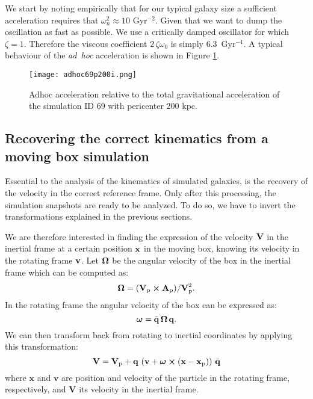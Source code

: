 We start by noting empirically that for our typical galaxy size a sufficient acceleration requires that $\omega_n^2\approx 10$ Gyr$^{-2}$.
Given that we want to dump the oscillation as fast as possible. We use a critically damped oscillator  for which $\zeta = 1$. Therefore the viscous coefficient $2\,\zeta\omega_0$ is simply $6.3$~Gyr$^{-1}$.
A typical behaviour of the \emph{ad~hoc} acceleration is shown in Figure \ref{fig:adhoc}.

\begin{figure}[ht]
\centering
  \texttt{[image: adhoc69p200i.png]}
\caption{Adhoc acceleration relative to the total gravitational acceleration of the simulation ID 69 with pericenter 200 kpc.}
\label{fig:adhoc}
\end{figure}


\subsection{Recovering the correct kinematics from a moving box simulation}
\label{sec:correct_kinematics}
Essential to the analysis of the kinematics of simulated galaxies, is the recovery of the velocity in the correct reference frame.
Only after this processing, the simulation snapshots are ready to be analyzed.
To do so, we have to invert the transformations explained in the previous sections.

We are therefore interested in finding the expression of the velocity $\boldsymbol{\mathbf{V}}$ in the inertial frame at a certain position $\boldsymbol{\mathbf{x}}$ in the moving box, knowing its velocity in the rotating frame $\boldsymbol{\mathbf{v}}$.
Let $\boldsymbol{\mathbf{\Omega}}$ be the angular velocity of the box in the inertial frame which can be computed as:
\begin{equation}
 \boldsymbol{\mathbf{\Omega}} = {(\boldsymbol{\mathbf{V}}_{\mathrm p}\cross\boldsymbol{\mathbf{A}}_{\mathrm p})}/{\boldsymbol{\mathbf{V}}_{\mathrm p}^2}.
\end{equation}
In the rotating frame the angular velocity of the box can be expressed as:
\begin{equation}
\boldsymbol{\mathbf{\omega}} = \bar{\mathbf{q}}\, \boldsymbol{\mathbf{\Omega}}\, \mathbf{q}.
\end{equation}
We can then transform back from rotating to inertial coordinates by applying this transformation:
\begin{equation}
\boldsymbol{\mathbf{V}} = \boldsymbol{\mathbf{V}}_{\mathrm p} + \mathbf{q} \, \left(\boldsymbol{\mathbf{v}} + \boldsymbol{\mathbf{\omega}} \cross (\boldsymbol{\mathbf{x}}-\boldsymbol{\mathbf{x}}_{\mathrm p})\right) \,\bar{\mathbf{q}}
\end{equation}
where $\mathbf x$ and $\mathbf v$ are position and velocity of the particle in the rotating frame, respectively, and $\mathbf V$ its velocity in the inertial frame. %

